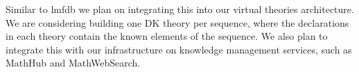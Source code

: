 Similar to lmfdb we plan on integrating this into our virtual theories architecture. We
are considering building one DK theory per sequence, where the declarations in each theory
contain the known elements of the sequence. We also plan to integrate this with our
infrastructure on knowledge management services, such as MathHub and MathWebSearch.



